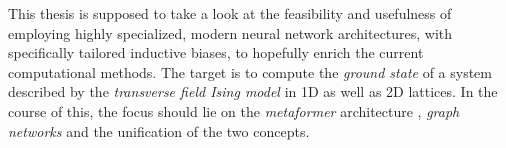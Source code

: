 This thesis is supposed to take a look at the feasibility and usefulness of employing highly specialized, modern neural network architectures, with specifically tailored inductive biases, to hopefully enrich the current computational methods. 
The target is to compute the \emph{ground state} of a system described by the \emph{transverse field Ising model} \cite{isingBook} in 1D as well as 2D lattices.
In the course of this, the focus should lie on the \emph{metaformer} architecture \cite{metaformerPaper}, \emph{graph networks} \cite{relationalInductiveBiasesAndGraphNetworks} and the unification of the two concepts.
